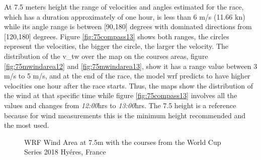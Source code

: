 At 7.5 meters height the range of velocities and angles estimated for the race, which has a duration approximately of one hour, is less than 6 m/s (11.66 kn) while its angle range is between [90,180] degrees with  dominated directions from [120,180] degrees. Figure \ref{fig:75compass13} shows both ranges, the circles represent the velocities, the bigger the circle, the larger the velocity. The distribution of the \acrshort{v_tw} over the map on the courses areas, figure \ref{fig:75mwindarea12} and \ref{fig:75mwindarea13}, show it has a range value between 3 m/s to 5 m/s, and at the end of the race, the model \acrshort{wrf} predicts to have higher velocities one hour after the race starts. Thus, the maps show the distribution of the wind at that specific time while figure \ref{fig:75compass13} involves all the values and changes from \textit{12:00}hrs to \textit{13:00}hrs.%
The 7.5 height is a reference because for wind measurements this is the minimum height recommended and the most used. 
\begin{figure} [hbt!]
  \centering
  \hfill
    \hfill
  \caption{WRF Wind Area at 7.5m with the courses from the World Cup Series 2018 Hyéres, France} %
\label{fig:75mwindarea12_13}
\end{figure}

